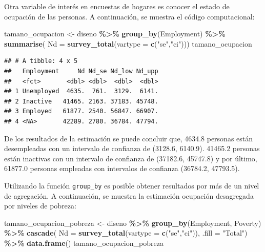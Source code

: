 \documentclass[
  12pt,
]{book}
\newenvironment{Shaded}{\begin{snugshade}}{\end{snugshade}}
\newcommand{\AttributeTok}[1]{\textcolor[rgb]{0.13,0.29,0.53}{#1}}
\newcommand{\FunctionTok}[1]{\textcolor[rgb]{0.13,0.29,0.53}{\textbf{#1}}}
\newcommand{\NormalTok}[1]{#1}
\newcommand{\OtherTok}[1]{\textcolor[rgb]{0.56,0.35,0.01}{#1}}
\newcommand{\SpecialCharTok}[1]{\textcolor[rgb]{0.81,0.36,0.00}{\textbf{#1}}}
\newcommand{\StringTok}[1]{\textcolor[rgb]{0.31,0.60,0.02}{#1}}
\begin{document}
Otra variable de interés en encuestas de hogares es conocer el estado de ocupación de las personas. A continuación, se muestra el código computacional:

\begin{Shaded}
\begin{Highlighting}[]
\NormalTok{tamano\_ocupacion }\OtherTok{\textless{}{-}}\NormalTok{ diseno }\SpecialCharTok{\%\textgreater{}\%} 
                    \FunctionTok{group\_by}\NormalTok{(Employment) }\SpecialCharTok{\%\textgreater{}\%} 
                    \FunctionTok{summarise}\NormalTok{( }\AttributeTok{Nd =} \FunctionTok{survey\_total}\NormalTok{(}\AttributeTok{vartype =} \FunctionTok{c}\NormalTok{(}\StringTok{"se"}\NormalTok{,}\StringTok{"ci"}\NormalTok{)))}
\NormalTok{tamano\_ocupacion}
\end{Highlighting}
\end{Shaded}

\begin{verbatim}
## # A tibble: 4 x 5
##   Employment     Nd Nd_se Nd_low Nd_upp
##   <fct>       <dbl> <dbl>  <dbl>  <dbl>
## 1 Unemployed  4635.  761.  3129.  6141.
## 2 Inactive   41465. 2163. 37183. 45748.
## 3 Employed   61877. 2540. 56847. 66907.
## 4 <NA>       42289. 2780. 36784. 47794.
\end{verbatim}

De los resultados de la estimación se puede concluir que, 4634.8 personas están desempleadas con un intervalo de confianza de (3128.6, 6140.9). 41465.2 personas están inactivas con un intervalo de confianza de (37182.6, 45747.8) y por último, 61877.0 personas empleadas con intervalos de confianza (36784.2, 47793.5).

Utilizando la función \texttt{group\_by} es posible obtener resultados por más de un nivel de agregación. A continuación, se muestra la estimación ocupación desagregada por niveles de pobreza:

\begin{Shaded}
\begin{Highlighting}[]
\NormalTok{tamano\_ocupacion\_pobreza }\OtherTok{\textless{}{-}}\NormalTok{ diseno }\SpecialCharTok{\%\textgreater{}\%} 
                            \FunctionTok{group\_by}\NormalTok{(Employment, Poverty) }\SpecialCharTok{\%\textgreater{}\%} 
                            \FunctionTok{cascade}\NormalTok{( }\AttributeTok{Nd =} \FunctionTok{survey\_total}\NormalTok{(}\AttributeTok{vartype =}                                     \FunctionTok{c}\NormalTok{(}\StringTok{"se"}\NormalTok{,}\StringTok{"ci"}\NormalTok{)), }\AttributeTok{.fill =} \StringTok{"Total"}\NormalTok{) }\SpecialCharTok{\%\textgreater{}\%}
                            \FunctionTok{data.frame}\NormalTok{()}
\NormalTok{tamano\_ocupacion\_pobreza}
\end{Highlighting}
\end{Shaded}
\end{document}
